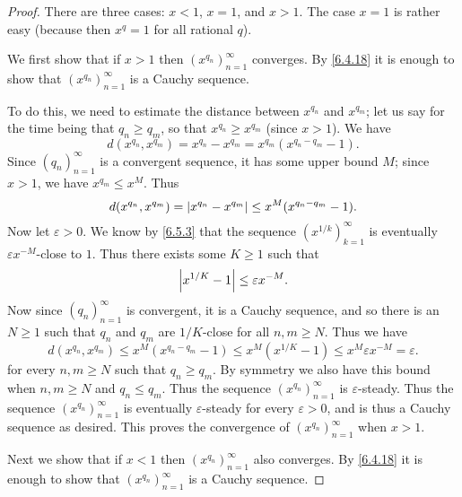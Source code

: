 \begin{proof}
  There are three cases: \(x < 1\), \(x = 1\), and \(x > 1\).
  The case \(x = 1\) is rather easy (because then \(x^q = 1\) for all rational \(q\)).

  We first show that if \(x > 1\) then \((x^{q_n})_{n = 1}^\infty\) converges.
  By \cref{6.4.18} it is enough to show that \((x^{q_n})_{n = 1}^\infty\) is a Cauchy sequence.

  To do this, we need to estimate the distance between \(x^{q_n}\) and \(x^{q_m}\);
  let us say for the time being that \(q_n \geq q_m\), so that \(x^{q_n} \geq x^{q_m}\) (since \(x > 1\)).
  We have
  \[
    d(x^{q_n}, x^{q_m}) = x^{q_n} - x^{q_m} = x^{q_m} (x^{q_n - q_m} - 1).
  \]
  Since \((q_n)_{n = 1}^\infty\) is a convergent sequence, it has some upper bound \(M\);
  since \(x > 1\), we have \(x^{q_m} \leq x^M\).
  Thus
  \[
    d(x^{q_n}, x^{q_m}) = \left\lvert x^{q_n} - x^{q_m}\right\rvert \leq x^M (x^{q_n - q_m} - 1).
  \]
  Now let \(\varepsilon > 0\).
  We know by \cref{6.5.3} that the sequence \((x^{1 / k})_{k = 1}^\infty\) is eventually \(\varepsilon x^{-M}\)-close to \(1\).
  Thus there exists some \(K \geq 1\) such that
  \[
    \left\lvert x^{1 / K} - 1\right\rvert \leq \varepsilon x^{-M}.
  \]
  Now since \((q_n)_{n = 1}^\infty\) is convergent, it is a Cauchy sequence, and so there is an \(N \geq 1\) such that \(q_n\) and \(q_m\) are \(1 / K\)-close for all \(n, m \geq N\).
  Thus we have
  \[
    d(x^{q_n}, x^{q_m}) \leq x^M (x^{q_n - q_m} - 1) \leq x^M (x^{1 / K} - 1) \leq x^M \varepsilon x^{-M} = \varepsilon.
  \]
  for every \(n, m \geq N\) such that \(q_n \geq q_m\).
  By symmetry we also have this bound when \(n, m \geq N\) and \(q_n \leq q_m\).
  Thus the sequence \((x^{q_n})_{n = 1}^\infty\) is \(\varepsilon\)-steady.
  Thus the sequence \((x^{q_n})_{n = 1}^\infty\) is eventually \(\varepsilon\)-steady for every \(\varepsilon > 0\), and is thus a Cauchy sequence as desired.
  This proves the convergence of \((x^{q_n})_{n = 1}^\infty\) when \(x > 1\).

  Next we show that if \(x < 1\) then \((x^{q_n})_{n = 1}^\infty\) also converges.
  By \cref{6.4.18} it is enough to show that \((x^{q_n})_{n = 1}^\infty\) is a Cauchy sequence.


\end{proof}

